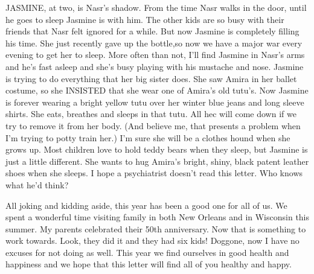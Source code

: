 JASMINE, at two, is Nasr's shadow. From the time Nasr walks in the door, until he goes to sleep Jasmine is with him. The other kids are so busy
with their friends that Nasr felt ignored for a while. But now Jasmine is completely filling his time. She just recently gave up the bottle,so
now we have a major war every evening to get her to sleep. More often than not, I'll find Jasmine in Nasr's arms and he's fast asleep and she's
busy playing with his mustache and nose. Jasmine is trying to do everything that her big sister does. She saw Amira in her ballet costume, so
she INSISTED that she wear one of Amira's old tutu's. Now Jasmine is forever wearing a bright yellow tutu over her winter blue jeans and long
sleeve shirts. She eats, breathes and sleeps in that tutu. All hec will come down if we try to remove it from her body. (And believe me, that
presents a problem when I'm trying to potty train her.) I'm sure she will be a clothes hound when she grows up. Most children love to hold teddy
bears when they sleep, but Jasmine is just a little different.   She wants to hug Amira's bright, shiny, black patent leather shoes when she
sleeps. I hope a psychiatrist doesn't read this letter. Who knows what he'd think?

All joking and kidding aside, this year has been a good one for all of us. We spent a wonderful time visiting family in both New Orleans and in
Wisconsin this summer. My parents celebrated their 50th anniversary. Now that is something to work towards. Look, they did it and they had six
kids! Doggone, now I have no excuses for not doing as well. This year we find ourselves in good health and happiness and we hope that this
letter will find all of you healthy and happy.



%
